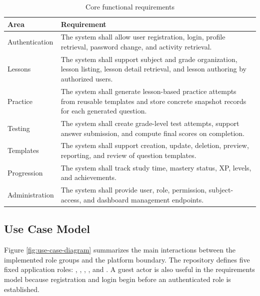 \begin{table}[H]
\centering
\caption{Core functional requirements}
\label{tab:functional-requirements}
\begin{tabularx}{\textwidth}{L{0.18\textwidth}Y}
\toprule
\textbf{Area} & \textbf{Requirement} \\
\midrule
Authentication & The system shall allow user registration, login, profile retrieval, password change, and activity retrieval. \\
Lessons & The system shall support subject and grade organization, lesson listing, lesson detail retrieval, and lesson authoring by authorized users. \\
Practice & The system shall generate lesson-based practice attempts from reusable templates and store concrete snapshot records for each generated question. \\
Testing & The system shall create grade-level test attempts, support answer submission, and compute final scores on completion. \\
Templates & The system shall support creation, update, deletion, preview, reporting, and review of question templates. \\
Progression & The system shall track study time, mastery status, XP, levels, and achievements. \\
Administration & The system shall provide user, role, permission, subject-access, and dashboard management endpoints. \\
\bottomrule
\end{tabularx}
\end{table}

\subsection{Use Case Model}

Figure \ref{fig:use-case-diagram} summarizes the main interactions between the implemented role groups and the platform boundary. The repository defines five fixed application roles: , , , , and . A guest actor is also useful in the requirements model because registration and login begin before an authenticated role is established.

